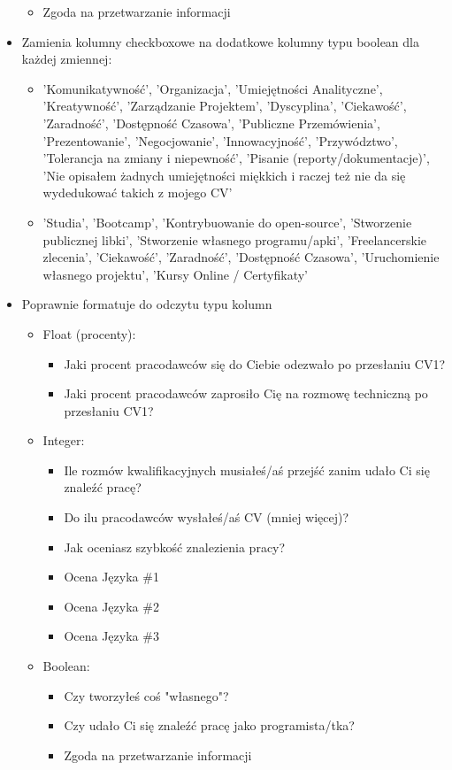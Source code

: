 \documentclass[graybox]{svmult}
\begin{document}
\begin{itemize}
\begin{itemize}
    \item Zgoda na przetwarzanie informacji
  \end{itemize}
  \item Zamienia kolumny checkboxowe na dodatkowe kolumny typu boolean dla każdej zmiennej:
  \begin{itemize}
    \item 'Komunikatywność', 'Organizacja', 'Umiejętności Analityczne', 'Kreatywność',
          'Zarządzanie Projektem', 'Dyscyplina', 'Ciekawość', 'Zaradność', 'Dostępność Czasowa',
          'Publiczne Przemówienia', 'Prezentowanie', 'Negocjowanie', 'Innowacyjność',
          'Przywództwo', 'Tolerancja na zmiany i niepewność', 'Pisanie (reporty/dokumentacje)',
          'Nie opisałem żadnych umiejętności miękkich i raczej też nie da się wydedukować takich z mojego CV'
    \item 'Studia', 'Bootcamp', 'Kontrybuowanie do open-source', 'Stworzenie publicznej libki',
          'Stworzenie własnego programu/apki', 'Freelancerskie zlecenia', 'Ciekawość', 'Zaradność', 'Dostępność Czasowa', 'Uruchomienie własnego projektu', 'Kursy Online / Certyfikaty'
  \end{itemize}

  \item Poprawnie formatuje do odczytu typu kolumn
  \begin{itemize}
    \item Float (procenty):
    \begin{itemize}
      \item Jaki procent pracodawców się do Ciebie odezwało po przesłaniu CV1?
      \item Jaki procent pracodawców zaprosiło Cię na rozmowę techniczną po przesłaniu CV1?
    \end{itemize}
    \item Integer:
    \begin{itemize}
      \item Ile rozmów kwalifikacyjnych musiałeś/aś przejść zanim udało Ci się znaleźć pracę?
      \item Do ilu pracodawców wysłałeś/aś CV (mniej więcej)?
      \item Jak oceniasz szybkość znalezienia pracy?
      \item Ocena Języka \#1
      \item Ocena Języka \#2
      \item Ocena Języka \#3
    \end{itemize}
    \item Boolean:
    \begin{itemize}
      \item Czy tworzyłeś coś "własnego"?
      \item Czy udało Ci się znaleźć pracę jako programista/tka?
      \item Zgoda na przetwarzanie informacji
    \end{itemize}
  \end{itemize}
\end{itemize}
\end{document}
